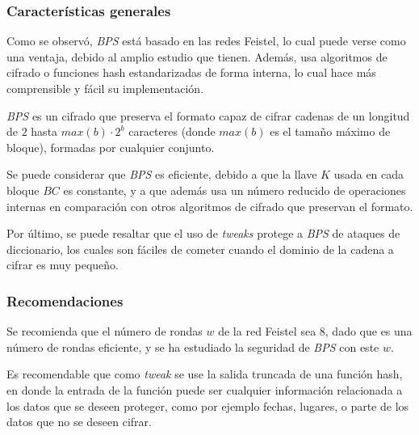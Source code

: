 \subsubsection{Características generales}

Como se observó, \textit{BPS} está basado en las redes Feistel, lo cual puede
verse como una ventaja, debido al amplio estudio que tienen. Además, usa
algoritmos de cifrado o funciones hash estandarizadas de forma interna, lo
cual hace más comprensible y fácil su implementación.

\textit{BPS} es un cifrado que preserva el formato capaz de cifrar cadenas de
un longitud de $2$ hasta $max(b) \cdot 2^{b}$ caracteres (donde $max(b)$ es el
tamaño máximo de bloque), formadas por cualquier conjunto.

Se puede considerar que \textit{BPS} es eficiente, debido a que la llave $K$
usada en cada bloque $BC$ es constante, y a que además usa un número reducido
de operaciones internas en comparación con otros algoritmos de cifrado que
preservan el formato.

Por último, se puede resaltar que el uso de \textit{tweaks} protege a
\textit{BPS} de ataques de diccionario, los cuales son fáciles de cometer cuando
el dominio de la cadena a cifrar es muy pequeño.


\subsubsection{Recomendaciones}

Se recomienda que el número de rondas $w$ de la red Feistel sea $8$, dado
que es una número de rondas eficiente, y se ha estudiado la seguridad de
\textit{BPS} con este $w$.

Es recomendable que como \textit{tweak} se use la salida truncada de una función
hash, en donde la entrada de la función puede ser cualquier información
relacionada a los datos que se deseen proteger, como por ejemplo fechas, lugares,
o parte de los datos que no se deseen cifrar.
